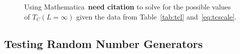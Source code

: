 \documentclass[12pt]{article}
\numberwithin{equation}{section}
\begin{document}
\begin{figure}[h]
\begin{center}
\caption{Using Mathematica~\textbf{need citation} to solve for the possible values of $T_{C}(L=\infty)$ given the data from Table~\ref{tab:tcl} and~\eqref{eq:tcscale}.}
\label{fig:tcsolve}
\end{center}
\end{figure}

\subsection{Testing Random Number Generators}
\label{subsec:randosresults}
\end{document}
